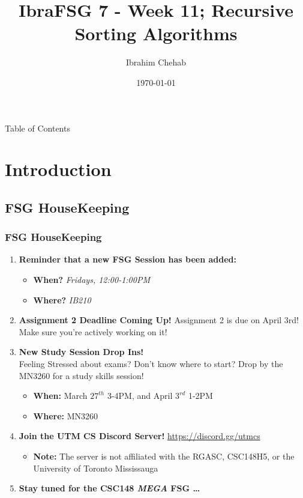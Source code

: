 \documentclass[hyperref={colorlinks,citecolor=blue,linkcolor=blue,urlcolor=blue}, aspectratio=1610]{beamer}
\title[IbraFSG 6: Midterm 2]{IbraFSG\texttrademark{} 7 - Week 11; Recursive Sorting Algorithms}
\author{Ibrahim Chehab}
\institute{UTM RGASC}
\date{\today}
\begin{document}
\begin{frame}
  \titlepage
\end{frame}

\begin{frame}{Table of Contents}
  \tableofcontents
\end{frame}

\section{Introduction}

\subsection{FSG HouseKeeping}
\begin{frame}
  \frametitle{FSG HouseKeeping}
  \begin{enumerate}
    \item \textbf{Reminder that a new FSG Session has been added:}
    \begin{itemize}
      \item \textbf{When?} \textit{Fridays, 12:00-1:00PM}
      \item \textbf{Where?} \textit{IB210}
    \end{itemize}
    \pause
    \item \textbf{Assignment 2 Deadline Coming Up!} Assignment 2 is due on April 3rd! Make sure you're actively working on it!
    \pause
    \item \textbf{New Study Session Drop Ins!} \\ Feeling Stressed about exams? Don't know where to start? Drop by the MN3260 for a study skills session! 
    \begin{itemize}
      \item \textbf{When:} March $27^{th}$ 3-4PM, and April $3^{rd}$ 1-2PM
      \item \textbf{Where:} MN3260
    \end{itemize}
    \pause
    \item \textbf{Join the UTM CS Discord Server!} \url{https://discord.gg/utmcs}
    \begin{itemize}
      \item \textbf{Note:} The server is not affiliated with the RGASC, CSC148H5, or the University of Toronto Mississauga
    \end{itemize}
    \item \textbf{Stay tuned for the CSC148 \textit{MEGA} FSG \dots}
  \end{enumerate}

\end{frame}
\end{document}
